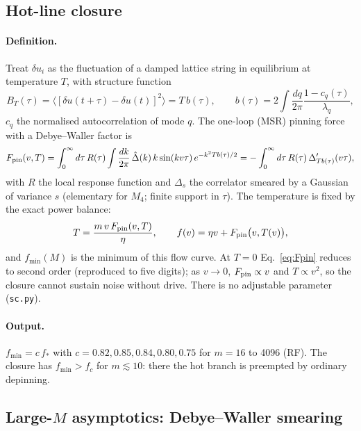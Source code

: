 \documentclass[10pt,a4paper]{article}
\newcommand{\fcs}{f_c}
\begin{document}
\subsection{Hot-line closure}

\paragraph{Definition.}
Treat $\delta u_i$ as the fluctuation of a damped lattice string in equilibrium at temperature $T$, with structure function
\[
B_T(\tau)=\langle[\delta u(t+\tau)-\delta u(t)]^2\rangle=T\,b(\tau),\qquad b(\tau)=2\int\frac{dq}{2\pi}\frac{1-c_q(\tau)}{\lambda_q},
\]
$c_q$ the normalised autocorrelation of mode $q$.
The one-loop (MSR) pinning force with a Debye--Waller factor is
\begin{equation}
F_{\rm pin}(v,T)=\int_0^\infty d\tau\,R(\tau)\int\frac{dk}{2\pi}\,\hat\Delta(k)\,k\sin(kv\tau)\,e^{-k^2Tb(\tau)/2}
=-\int_0^\infty d\tau\,R(\tau)\,\Delta'_{Tb(\tau)}(v\tau),
\label{eq:Fpin}
\end{equation}
with $R$ the local response function and $\Delta_s$ the correlator smeared by a Gaussian of variance $s$ (elementary for $M_4$; finite support in $\tau$).
The temperature is fixed by the exact power balance:
\begin{equation}
T=\frac{m\,v\,F_{\rm pin}(v,T)}{\eta},\qquad f(v)=\eta v+F_{\rm pin}\big(v,T(v)\big),
\end{equation}
and $f_{\min}(M)$ is the minimum of this flow curve.
At $T=0$ Eq.~\eqref{eq:Fpin} reduces to second order (reproduced to five digits); as $v\to0$, $F_{\rm pin}\propto v$ and $T\propto v^2$, so the closure cannot sustain noise without drive. There is no adjustable parameter (\texttt{sc.py}).

\paragraph{Output.}
$f_{\min}=c\,f_*$ with $c=0.82,0.85,0.84,0.80,0.75$ for $m=16$ to 4096 (RF). The closure has $f_{\min}>\fcs$ for $m\lesssim10$: there the hot branch is preempted by ordinary depinning.

\subsection{Large-$M$ asymptotics: Debye--Waller smearing}
\label{sec:asym}
\end{document}
